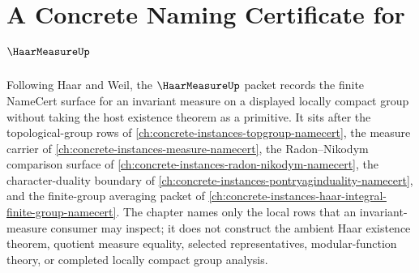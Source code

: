 \chapter{A Concrete Naming Certificate for $\HaarMeasureUp$}
\label{ch:concrete-instances-haar-measure-namecert}

Following Haar and Weil, the $\HaarMeasureUp$ packet records the finite NameCert surface for an invariant measure on a displayed locally compact group without taking the host existence theorem as a primitive. It sits after the topological-group rows of \autoref{ch:concrete-instances-topgroup-namecert}, the measure carrier of \autoref{ch:concrete-instances-measure-namecert}, the Radon--Nikodym comparison surface of \autoref{ch:concrete-instances-radon-nikodym-namecert}, the character-duality boundary of \autoref{ch:concrete-instances-pontryaginduality-namecert}, and the finite-group averaging packet of \autoref{ch:concrete-instances-haar-integral-finite-group-namecert}. The chapter names only the local rows that an invariant-measure consumer may inspect; it does not construct the ambient Haar existence theorem, quotient measure equality, selected representatives, modular-function theory, or completed locally compact group analysis.

